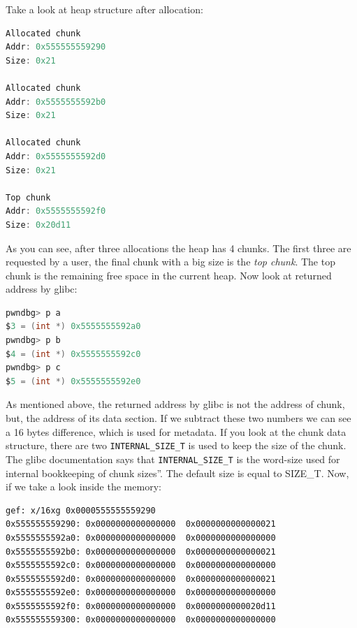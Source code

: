 \documentclass{masterthesis}
\newcommand*\sizet{SIZE\_T}
\newcommand*\libc{glibc}
\begin{document}
Take a look at heap structure after allocation:

\begin{lstlisting}[language=c,frame=tlrb]
Allocated chunk
Addr: 0x555555559290
Size: 0x21

Allocated chunk
Addr: 0x5555555592b0
Size: 0x21

Allocated chunk
Addr: 0x5555555592d0
Size: 0x21

Top chunk
Addr: 0x5555555592f0
Size: 0x20d11
\end{lstlisting}

As you can see, after three allocations the heap has 4 chunks. The first three are requested by a user, the final chunk with a big size is the \emph{top chunk}. The top chunk is the remaining free space in the current heap. Now look at returned address by \libc{}:

\begin{lstlisting}[language=c,frame=tlrb]
pwndbg> p a
$3 = (int *) 0x5555555592a0
pwndbg> p b
$4 = (int *) 0x5555555592c0
pwndbg> p c
$5 = (int *) 0x5555555592e0
\end{lstlisting}

As mentioned above, the returned address by \libc{} is not the address of chunk, but, the address of its data section. If we subtract these two numbers we can see a 16 bytes difference, which is used for metadata. If you look at the chunk data structure, there are two \lstinline{INTERNAL_SIZE_T} is used to keep the size of the chunk. The \libc{} documentation says that \lstinline{INTERNAL_SIZE_T} is the word-size used for internal bookkeeping of chunk sizes''. The default size is equal to \sizet{}. Now, if we take a look inside the memory:

\begin{lstlisting}[frame=tlrb]
gef: x/16xg 0x0000555555559290
0x555555559290:	0x0000000000000000	0x0000000000000021
0x5555555592a0:	0x0000000000000000	0x0000000000000000
0x5555555592b0:	0x0000000000000000	0x0000000000000021
0x5555555592c0:	0x0000000000000000	0x0000000000000000
0x5555555592d0:	0x0000000000000000	0x0000000000000021
0x5555555592e0:	0x0000000000000000	0x0000000000000000
0x5555555592f0:	0x0000000000000000	0x0000000000020d11
0x555555559300:	0x0000000000000000	0x0000000000000000
\end{lstlisting}
\end{document}
